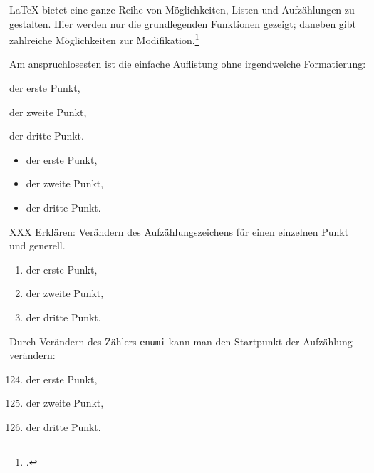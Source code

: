 \LaTeX{} bietet eine ganze Reihe von Möglichkeiten, Listen und Aufzählungen zu gestalten.
Hier werden nur die grundlegenden Funktionen gezeigt; daneben gibt zahlreiche Möglichkeiten zur
Modifikation.\footcite[295\psqq]{voss:einfuehrung}



Am anspruchlosesten ist die einfache Auflistung ohne irgendwelche Formatierung:

\begin{LTXexample}
\begin{trivlist}
 \item der erste Punkt,
 \item der zweite Punkt,
 \item der dritte Punkt.
\end{trivlist} 
\end{LTXexample}



\begin{LTXexample}
\begin{itemize}
 \item der erste Punkt,
 \item der zweite Punkt,
 \item der dritte Punkt.
\end{itemize} 
\end{LTXexample}

XXX Erklären: Verändern des Aufzählungszeichens für einen einzelnen Punkt und generell.



\begin{LTXexample}
\begin{enumerate}
 \item der erste Punkt,
 \item der zweite Punkt,
 \item der dritte Punkt.
\end{enumerate} 
\end{LTXexample}

Durch Verändern des Zählers \lstinline/enumi/ kann man den Startpunkt der 
Aufzählung verändern:

\begin{LTXexample}
\begin{enumerate}
 \setcounter{enumi}{123}
 \item der erste Punkt,
 \item der zweite Punkt,
 \item der dritte Punkt.
\end{enumerate} 
\end{LTXexample}


